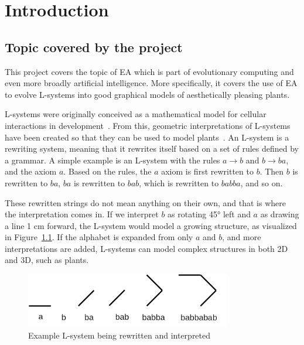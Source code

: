 \chapter{Introduction}
\label{chap:introduction}

\section{Topic covered by the project}
\label{sec:topic}

This project covers the topic of \gls{EA} which is part of evolutionary computing and even more broadly artificial intelligence.
More specifically, it covers the use of \gls{EA} to evolve \glspl{L-system} into good graphical models of aesthetically pleasing plants.

\glspl{L-system} were originally conceived as a mathematical model for cellular interactions in development~\cite{1968Lindenmayer-1,1968Lindenmayer-2}.
From this, geometric interpretations of L-systems have been created so that they can be used to model plants~\cite{2012Prusinkiewicz}.
An L-system is a rewriting system, meaning that it rewrites itself based on a set of rules defined by a grammar.
A simple example is an L-system with the rules $a \rightarrow b$ and $b \rightarrow ba$, and the axiom $a$.
Based on the rules, the $a$ axiom is first rewritten to $b$.
Then $b$ is rewritten to $ba$, $ba$ is rewritten to $bab$, which is rewritten to $babba$, and so on.

These rewritten strings do not mean anything on their own, and that is where the interpretation comes in.
If we interpret $b$ as rotating 45° left and $a$ as drawing a line 1 cm forward, the L-system would model a growing structure, as visualized in Figure~\ref{fig:example-l}.
If the alphabet is expanded from only $a$ and $b$, and more interpretations are added, L-systems can model complex structures in both 2D and 3D, such as plants.

\begin{figure}
    \centering
    \includegraphics[width=0.8\textwidth]{figures/lsystem}
    \caption{Example L-system being rewritten and interpreted}
    \label{fig:example-l}
\end{figure}

